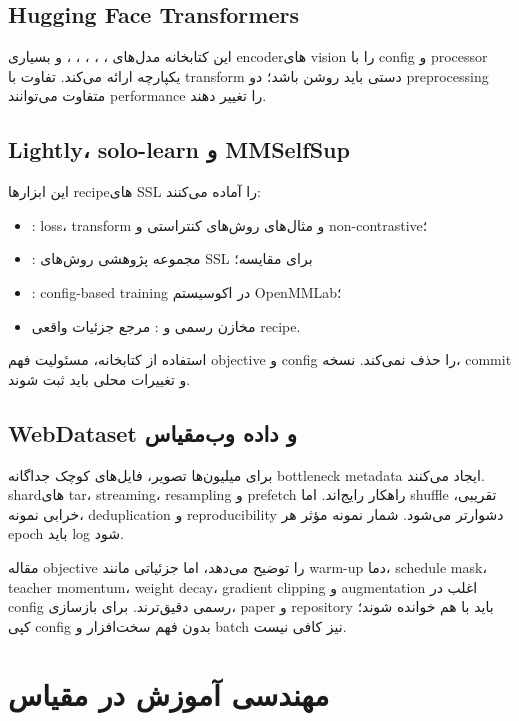 \documentclass[12pt,openany,oneside]{book}
\begin{document}
\subsection{Hugging Face Transformers}
این کتابخانه مدل‌های ، ، ، ، ،  و بسیاری encoderهای vision را با config و processor یکپارچه ارائه می‌کند. تفاوت  با transform دستی باید روشن باشد؛ دو preprocessing متفاوت می‌توانند performance را تغییر دهند.

\subsection{Lightly، solo-learn و MMSelfSup}
این ابزارها recipeهای SSL را آماده می‌کنند:
\begin{itemize}
\item {}: loss، transform و مثال‌های روش‌های کنتراستی و non-contrastive؛
\item {}: مجموعه پژوهشی روش‌های SSL برای مقایسه؛
\item {}: config-based training در اکوسیستم OpenMMLab؛
\item مخازن رسمی  و : مرجع جزئیات واقعی recipe.
\end{itemize}
استفاده از کتابخانه، مسئولیت فهم objective و config را حذف نمی‌کند. نسخه، commit و تغییرات محلی باید ثبت شوند.

\subsection{WebDataset و داده وب‌مقیاس}
برای میلیون‌ها تصویر، فایل‌های کوچک جداگانه bottleneck metadata ایجاد می‌کنند. shardهای tar، streaming، resampling و prefetch راهکار رایج‌اند. اما shuffle تقریبی، خرابی نمونه، deduplication و reproducibility دشوارتر می‌شود. شمار نمونه مؤثر هر epoch باید log شود.

\begin{librarybox}
مقاله objective را توضیح می‌دهد، اما جزئیاتی مانند warm-up دما، schedule mask، teacher momentum، weight decay، gradient clipping و augmentation اغلب در config رسمی دقیق‌ترند. برای بازسازی، paper و repository باید با هم خوانده شوند؛ کپی config بدون فهم سخت‌افزار و batch نیز کافی نیست.
\end{librarybox}

\section{مهندسی آموزش در مقیاس}
\end{document}
